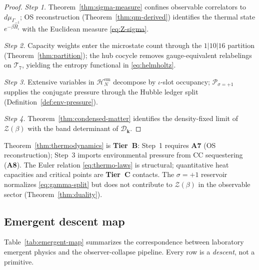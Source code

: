 \begin{proof}
\emph{Step 1.}
Theorem~\ref{thm:sigma-measure} confines observable correlators to
$d\mu_{\Gamma_{-1}}$; OS reconstruction (Theorem~\ref{thm:qm-derived})
identifies the thermal state $e^{-\beta\hat H_\iota}$ with the Euclidean
measure \eqref{eq:Z-sigma}.

\emph{Step 2.}
Capacity weights enter the microstate count through the $1|10|16$ partition
(Theorem~\ref{thm:partition}); the hub cocycle removes gauge-equivalent
relabelings on $\mathcal{T}_7$, yielding the entropy functional in
\eqref{eq:helmholtz}.

\emph{Step 3.}
Extensive variables in $\mathcal{H}_N^{\mathrm{em}}$ decompose by
$\iota$-slot occupancy; $\mathcal{P}_{\sigma=+1}$ supplies the conjugate
pressure through the Hubble ledger split (Definition~\ref{def:env-pressure}).

\emph{Step 4.}
Theorem~\ref{thm:condensed-matter} identifies the density-fixed limit of
$\mathcal{Z}(\beta)$ with the band determinant of $\mathcal{D}_{\mathbf{k}}$.
\end{proof}

\begin{remark}
Theorem~\ref{thm:thermodynamics} is \textbf{Tier~B}: Step~1 requires
\textbf{A7} (OS reconstruction); Step~3 imports environmental pressure from
CC sequestering (\textbf{A8}). The Euler relation \eqref{eq:thermo-laws} is
structural; quantitative heat capacities and critical points are
\textbf{Tier~C} contacts. The $\sigma=+1$ reservoir normalizes
\eqref{eq:gamma-split} but does not contribute to $\mathcal{Z}(\beta)$ in
the observable sector (Theorem~\ref{thm:duality}).
\end{remark}

\subsection{Emergent descent map}
\label{sec:emergent:map}

Table~\ref{tab:emergent-map} summarizes the correspondence between
laboratory emergent physics and the observer-collapse pipeline. Every row is
a \emph{descent}, not a primitive.

